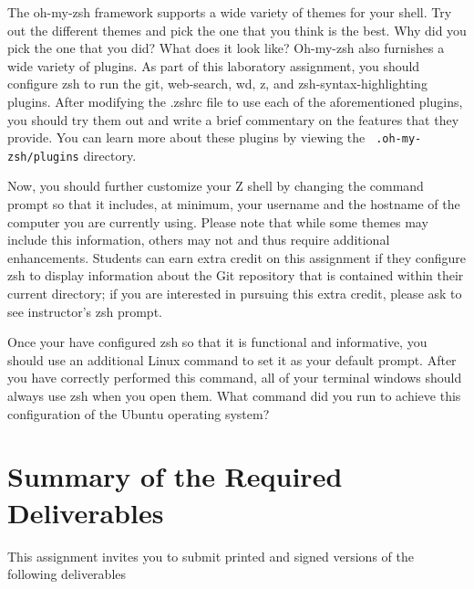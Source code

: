 The oh-my-zsh framework supports a wide variety of themes for your shell.  Try out the different themes and pick the one that you
think is the best.  Why did you pick the one that you did? What does it look like? Oh-my-zsh also furnishes a wide variety of
plugins.  As part of this laboratory assignment, you should configure zsh to run the git, web-search, wd, z, and
zsh-syntax-highlighting plugins.  After modifying the .zshrc file to use each of the aforementioned plugins, you should try them
out and write a brief commentary on the features that they provide. You can learn more about these plugins by viewing the {\tt
  .oh-my-zsh/plugins} directory.

Now, you should further customize your Z shell by changing the command prompt so that it includes, at minimum, your username and
the hostname of the computer you are currently using.  Please note that while some themes may include this information, others may
not and thus require additional enhancements.  Students can earn extra credit on this assignment if they configure zsh to display
information about the Git repository that is contained within their current directory; if you are interested in pursuing this
extra credit, please ask to see instructor's zsh prompt.

Once your have configured zsh so that it is functional and informative, you should use an additional Linux command to set it as
your default prompt.  After you have correctly performed this command, all of your terminal windows should always use zsh when you
open them.  What command did you run to achieve this configuration of the Ubuntu operating system?

\section*{Summary of the Required Deliverables}

This assignment invites you to submit printed and signed versions of the following deliverables 

